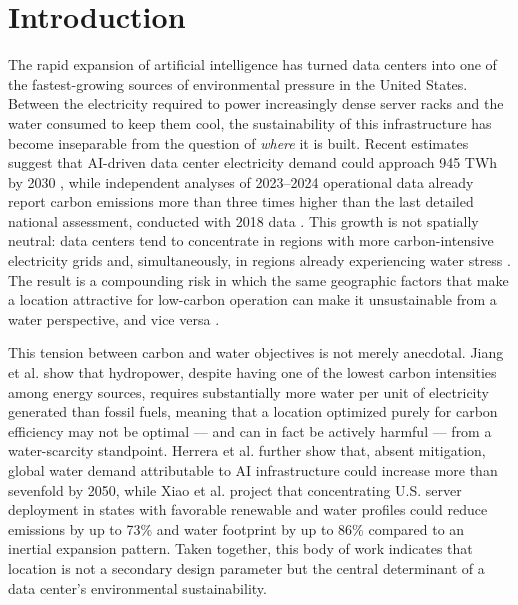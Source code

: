 \documentclass[conference]{IEEEtran}
\begin{document}
\section{Introduction}

The rapid expansion of artificial intelligence has turned data centers into one of the fastest-growing sources of environmental pressure in the United States. Between the electricity required to power increasingly dense server racks and the water consumed to keep them cool, the sustainability of this infrastructure has become inseparable from the question of \textit{where} it is built. Recent estimates suggest that AI-driven data center electricity demand could approach 945 TWh by 2030 \cite{Yoo2026}, while independent analyses of 2023--2024 operational data already report carbon emissions more than three times higher than the last detailed national assessment, conducted with 2018 data \cite{Guidi2024, Siddik2021}. This growth is not spatially neutral: data centers tend to concentrate in regions with more carbon-intensive electricity grids \cite{Guidi2024} and, simultaneously, in regions already experiencing water stress \cite{Barnett2026}. The result is a compounding risk in which the same geographic factors that make a location attractive for low-carbon operation can make it unsustainable from a water perspective, and vice versa \cite{Jiang2025WaterWise}.

This tension between carbon and water objectives is not merely anecdotal. Jiang et al. \cite{Jiang2025WaterWise} show that hydropower, despite having one of the lowest carbon intensities among energy sources, requires substantially more water per unit of electricity generated than fossil fuels, meaning that a location optimized purely for carbon efficiency may not be optimal --- and can in fact be actively harmful --- from a water-scarcity standpoint. Herrera et al. \cite{Herrera2025} further show that, absent mitigation, global water demand attributable to AI infrastructure could increase more than sevenfold by 2050, while Xiao et al. \cite{Xiao2025NetZero} project that concentrating U.S. server deployment in states with favorable renewable and water profiles could reduce emissions by up to 73\% and water footprint by up to 86\% compared to an inertial expansion pattern. Taken together, this body of work indicates that location is not a secondary design parameter but the central determinant of a data center's environmental sustainability.
\end{document}
